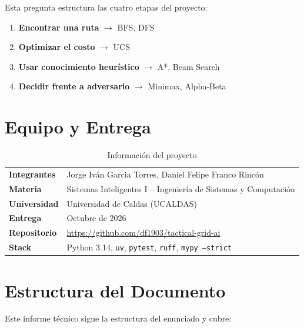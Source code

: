 Esta pregunta estructura las cuatro etapas del proyecto:

\begin{enumerate}
\item \textbf{Encontrar una ruta} $\to$ BFS, DFS
\item \textbf{Optimizar el costo} $\to$ UCS
\item \textbf{Usar conocimiento heurístico} $\to$ A*, Beam Search
\item \textbf{Decidir frente a adversario} $\to$ Minimax, Alpha-Beta
\end{enumerate}

\section{Equipo y Entrega}
\label{sec:equipo}

\begin{table}[H]
\centering
\caption{Información del proyecto}
\begin{tabular}{ll}
\toprule
\textbf{Integrantes} & Jorge Iván Garcia Torres, Daniel Felipe Franco Rincón \\
\textbf{Materia} & Sistemas Inteligentes I -- Ingeniería de Sistemas y Computación \\
\textbf{Universidad} & Universidad de Caldas (UCALDAS) \\
\textbf{Entrega} & Octubre de 2026 \\
\textbf{Repositorio} & \url{https://github.com/df1903/tactical-grid-ai} \\
\textbf{Stack} & Python 3.14, \texttt{uv}, \texttt{pytest}, \texttt{ruff}, \texttt{mypy --strict} \\
\bottomrule
\end{tabular}
\end{table}

\section{Estructura del Documento}
\label{sec:estructura-doc}

Este informe técnico sigue la estructura del enunciado y cubre:

